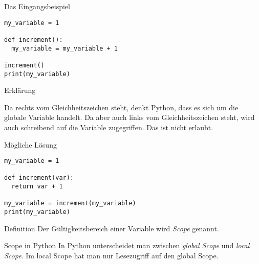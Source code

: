 \begin{fragile}
	
\begin{block}{Das Eingangsbeispiel}
\vspace{2pt}

\begin{verbatim}
my_variable = 1

def increment(): 
  my_variable = my_variable + 1

increment()
print(my_variable)
\end{verbatim}

\vspace{12pt}

\end{block}

\begin{exampleblock}{Erklärung}

\pause 

Da  rechts vom Gleichheitszeichen steht, denkt Python, dass es sich um die globale Variable  handelt. Da  aber auch links vom Gleichheitszeichen steht, wird auch schreibend auf die Variable zugegriffen. Das ist nicht erlaubt. 

\end{exampleblock}
	
\end{fragile}


\begin{fragile}

\begin{block}{Mögliche Lösung}
	\vspace{2pt}
\begin{verbatim}
my_variable = 1

def increment(var): 
  return var + 1

my_variable = increment(my_variable)
print(my_variable)
\end{verbatim}

\vspace{12pt}

\end{block}
	
\end{fragile}

\begin{frame}
	
\begin{block}{Definition}
\vspace{2pt}
Der Gültigkeitsbereich einer Variable wird \emph{Scope} genannt. 
\end{block}
\vspace{12pt}
\pause 

\begin{block}{Scope in Python}
\vspace{2pt}
In Python unterscheidet man zwischen \emph{global Scope} und \emph{local Scope}. Im local Scope hat man nur Lesezugriff auf den global Scope. 	
\end{block}
	
\end{frame}

